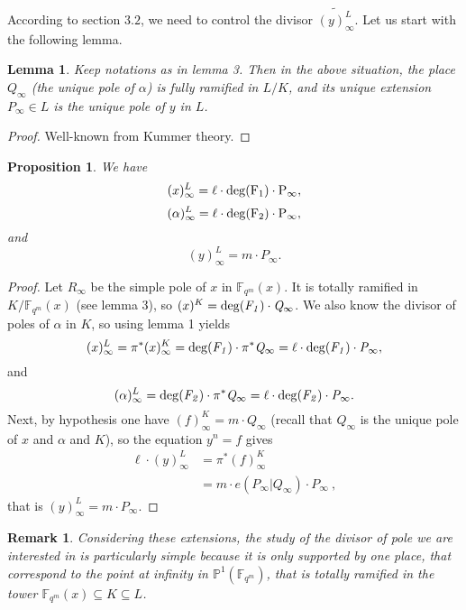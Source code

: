 \documentclass[10pt]{article}
\newtheorem{prop1}{Proposition}[]
\newtheorem{lem1}{Lemma}[]
\newtheorem{rq1}{Remark}[]
\newcommand{\s}{\vspace{0.3cm}}
\newcommand{\cd}{\cdot}
\newcommand{\fqm}{\mathbb{F}_{q^m}}
\newcommand{\su}{\subseteq}
\begin{document}
\s


According to section $3.2$, we need to control the divisor $\widetilde{(y)^L_{\infty}}$. Let us start with the following lemma.

\s

\begin{lem1}
Keep notations as in lemma 3. Then in the above situation, the place $Q_{\infty}$ (the unique pole of $\alpha$) is fully ramified in $L/K$, and its unique extension $P_{\infty} \in L$ is the unique pole of $y$ in $L$. 
\end{lem1}

\s

\begin{proof}
Well-known from Kummer theory.
\end{proof}

\s

\begin{prop1}
We have
\[(x)^L_{\infty} = \ell \cd \rm{deg}(F_1) \cd P_{\infty},\]
\[(\alpha)^L_{\infty} = \ell \cd \rm{deg}(F_2) \cd P_{\infty},\]
and
\[(y)^L_{\infty} = m \cd P_{\infty}.\]
\end{prop1}

\s

\begin{proof}
Let $R_{\infty}$ be the simple pole of $x$ in $\fqm(x)$. It is totally ramified in $K/\fqm(x)$ (see lemma 3), so $(x)^K = \rm{deg}\it(F_1) \cd Q_{\infty}$. We also know the divisor of poles of $\alpha$ in $K$, so using lemma 1 yields
\[(x)^L_{\infty} = \pi^*(x)^K_{\infty} = \rm{deg}\it(F_1) \cd \pi^*Q_{\infty} = \ell \cd \rm{deg}\it(F_1) \cd P_{\infty},\]
and
\[(\alpha)^L_{\infty} = \rm{deg}\it(F_2) \cd \pi^*Q_{\infty} = \ell \cd \rm{deg}\it(F_2) \cd P_{\infty}.\]
Next, by hypothesis one have $(f)^K_{\infty} = m \cd Q_{\infty}$ (recall that $Q_{\infty}$ is the unique pole of $x$ and $\alpha$ and $K$), so the equation $y^n=f$ gives
\begin{align*} \ell \cd (y)^L_{\infty} &= \pi^*(f)^K_{\infty} \\
&= m \cd e(P_{\infty}|Q_{\infty}) \cd P_{\infty} \ ,
\end{align*}
that is $(y)^L_{\infty} = m \cd P_{\infty}.$
\end{proof}

\s

\begin{rq1} \rm Considering these extensions, the study of the divisor of pole we are interested in is particularly simple because it is only supported by one place, that correspond to the point at infinity in $\mathbb{P}^1(\fqm)$, that is totally ramified in the tower $\fqm(x)\su K \su L$.
\end{rq1}
\end{document}
